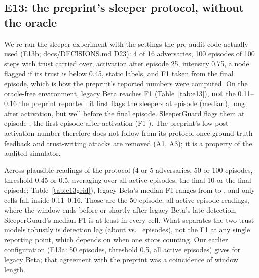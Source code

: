 \subsection{E13: the preprint's sleeper protocol, without the oracle}
We re-ran the sleeper experiment with the settings the pre-audit code actually used (E13b; docs/DECISIONS.md D23):
4 of 16 adversaries, 100 episodes of 100 steps with trust carried over, activation after episode 25, intensity 0.75,
a node flagged if its trust is below 0.45, static labels, and F1 taken from the final episode, which is how the
preprint's reported numbers were computed. On the oracle-free environment, legacy Beta reaches F1 \EthirteenbLegacyFOne{}
(Table~\ref{tab:e13}), \textbf{not} the 0.11--0.16 the preprint reported: it first flags the sleepers at episode
\EthirteenbLegacyFirstEp{} (median), long after activation, but well before the final episode. SleeperGuard flags them at
episode \EthirteenbSgFirstEp{}, the first episode after activation (F1 \EthirteenbSgFOne{}). The preprint's low post-activation
number therefore does not follow from its protocol once ground-truth feedback and trust-writing attacks are removed
(A1, A3); it is a property of the audited simulator.

Across \EthirteenGridCells{} plausible readings of the protocol (4 or 5 adversaries, 50 or 100 episodes, threshold 0.45 or
0.5, averaging over all active episodes, the final 10 or the final episode; Table~\ref{tab:e13grid}), legacy Beta's median
F1 ranges from \EthirteenGridLegacyMin{} to \EthirteenGridLegacyMax{}, and only \EthirteenGridInside{} cells fall inside
0.11--0.16. Those are the 50-episode, all-active-episode readings, where the window ends before or shortly after legacy
Beta's late detection. SleeperGuard's median F1 is at least \EthirteenGridSgMin{} in every cell. What separates the two
trust models robustly is detection lag (about \EthirteenbLegacyFirstEp{} vs.\ \EthirteenbSgFirstEp{} episodes), not the F1 at
any single reporting point, which depends on when one stops counting. Our earlier configuration (E13a: 50 episodes,
threshold 0.5, all active episodes) gives \EthirteenaLegacyFOne{} for legacy Beta; that agreement with the preprint was a
coincidence of window length.



